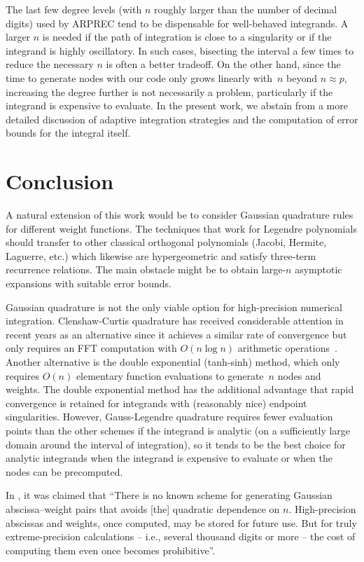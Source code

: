 \documentclass[11pt,a4paper]{article}
\begin{document}
The last few degree levels (with $n$ roughly larger than
the number of decimal digits) used by ARPREC
tend to be dispensable for well-behaved integrands.
A larger $n$ is needed if the path of integration
is close to a singularity or if the integrand is highly oscillatory.
In such cases, bisecting the interval a few times
to reduce the necessary $n$ is often a better tradeoff.
On the other hand, since the time to generate nodes with our code only
grows linearly with~$n$ beyond $n \approx p$,
increasing the degree further is not necessarily a problem,
particularly if the integrand is expensive to evaluate.
In the present work, we abstain from a more detailed discussion of
adaptive integration strategies and the computation
of error bounds for the integral itself.

\section{Conclusion}

A natural extension of this work would be to
consider Gaussian quadrature rules for different
weight functions.
The techniques that work for Legendre polynomials should transfer to other
classical orthogonal polynomials (Jacobi, Hermite, Laguerre, etc.)
which likewise are hypergeometric and satisfy three-term recurrence relations.
The main obstacle might be
to obtain large-$n$ asymptotic expansions with suitable error bounds.

Gaussian quadrature is not the only viable
option for high-precision numerical integration. Clenshaw-Curtis quadrature
has received considerable attention in recent years
as an alternative
since it achieves a similar rate of convergence
but only requires an FFT computation with $O(n \log n)$ arithmetic operations~\cite{trefethen2008gauss}.
Another alternative is the double exponential (tanh-sinh) method,
which only requires $O(n)$ elementary function evaluations
to generate~$n$ nodes and weights.
The double exponential method has the additional advantage
that rapid convergence is retained
for integrands with (reasonably nice) endpoint singularities.
However, Gauss-Legendre quadrature requires fewer evaluation
points than the other schemes if the integrand is analytic
(on a sufficiently large domain around
the interval of integration), so it tends to be the best
choice for analytic integrands when the integrand is expensive
to evaluate or when the nodes can be precomputed.

In \cite{bailey2011high}, it was claimed that
``There is no known scheme for generating Gaussian abscissa--weight pairs
that avoids [the] quadratic dependence
on $n$. High-precision abscissas
and weights, once computed, may be stored for future use. But for truly
extreme-precision calculations -- i.e., several thousand digits or
more -- the cost of computing them
even once becomes prohibitive''.
\end{document}
